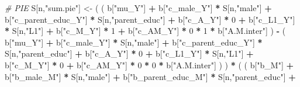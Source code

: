 \documentclass[
]{book}
\newenvironment{Shaded}{\begin{snugshade}}{\end{snugshade}}
\newcommand{\CommentTok}[1]{\textcolor[rgb]{0.56,0.35,0.01}{\textit{#1}}}
\newcommand{\DecValTok}[1]{\textcolor[rgb]{0.00,0.00,0.81}{#1}}
\newcommand{\NormalTok}[1]{#1}
\newcommand{\OtherTok}[1]{\textcolor[rgb]{0.56,0.35,0.01}{#1}}
\newcommand{\SpecialCharTok}[1]{\textcolor[rgb]{0.81,0.36,0.00}{\textbf{#1}}}
\newcommand{\StringTok}[1]{\textcolor[rgb]{0.31,0.60,0.02}{#1}}
\begin{document}
\begin{Shaded}
\begin{Highlighting}[]
    \CommentTok{\# PIE }
\NormalTok{    S[n,}\StringTok{"sum.pie"}\NormalTok{] }\OtherTok{\textless{}{-}}\NormalTok{ ( ( b[}\StringTok{"mu\_Y"}\NormalTok{] }\SpecialCharTok{+} 
\NormalTok{                            b[}\StringTok{"c\_male\_Y"}\NormalTok{] }\SpecialCharTok{*}\NormalTok{ S[n,}\StringTok{"male"}\NormalTok{] }\SpecialCharTok{+} 
\NormalTok{                            b[}\StringTok{"c\_parent\_educ\_Y"}\NormalTok{] }\SpecialCharTok{*}\NormalTok{ S[n,}\StringTok{"parent\_educ"}\NormalTok{] }\SpecialCharTok{+} 
\NormalTok{                            b[}\StringTok{"c\_A\_Y"}\NormalTok{] }\SpecialCharTok{*} \DecValTok{0} \SpecialCharTok{+} 
\NormalTok{                            b[}\StringTok{"c\_L1\_Y"}\NormalTok{] }\SpecialCharTok{*}\NormalTok{ S[n,}\StringTok{"L1"}\NormalTok{] }\SpecialCharTok{+}
\NormalTok{                            b[}\StringTok{"c\_M\_Y"}\NormalTok{] }\SpecialCharTok{*} \DecValTok{1} \SpecialCharTok{+}
\NormalTok{                            b[}\StringTok{"c\_AM\_Y"}\NormalTok{] }\SpecialCharTok{*} \DecValTok{0} \SpecialCharTok{*} \DecValTok{1} \SpecialCharTok{*}\NormalTok{ b[}\StringTok{"A.M.inter"}\NormalTok{] ) }\SpecialCharTok{{-}} 
\NormalTok{                          ( b[}\StringTok{"mu\_Y"}\NormalTok{] }\SpecialCharTok{+} 
\NormalTok{                              b[}\StringTok{"c\_male\_Y"}\NormalTok{] }\SpecialCharTok{*}\NormalTok{ S[n,}\StringTok{"male"}\NormalTok{] }\SpecialCharTok{+} 
\NormalTok{                              b[}\StringTok{"c\_parent\_educ\_Y"}\NormalTok{] }\SpecialCharTok{*}\NormalTok{ S[n,}\StringTok{"parent\_educ"}\NormalTok{] }\SpecialCharTok{+} 
\NormalTok{                              b[}\StringTok{"c\_A\_Y"}\NormalTok{] }\SpecialCharTok{*} \DecValTok{0} \SpecialCharTok{+} 
\NormalTok{                              b[}\StringTok{"c\_L1\_Y"}\NormalTok{] }\SpecialCharTok{*}\NormalTok{ S[n,}\StringTok{"L1"}\NormalTok{] }\SpecialCharTok{+}
\NormalTok{                              b[}\StringTok{"c\_M\_Y"}\NormalTok{] }\SpecialCharTok{*} \DecValTok{0} \SpecialCharTok{+}
\NormalTok{                              b[}\StringTok{"c\_AM\_Y"}\NormalTok{] }\SpecialCharTok{*} \DecValTok{0} \SpecialCharTok{*} \DecValTok{0} \SpecialCharTok{*}\NormalTok{ b[}\StringTok{"A.M.inter"}\NormalTok{] ) ) }\SpecialCharTok{*}
\NormalTok{      ( ( b[}\StringTok{"b\_M"}\NormalTok{] }\SpecialCharTok{+} 
\NormalTok{            b[}\StringTok{"b\_male\_M"}\NormalTok{] }\SpecialCharTok{*}\NormalTok{ S[n,}\StringTok{"male"}\NormalTok{] }\SpecialCharTok{+} 
\NormalTok{            b[}\StringTok{"b\_parent\_educ\_M"}\NormalTok{] }\SpecialCharTok{*}\NormalTok{ S[n,}\StringTok{"parent\_educ"}\NormalTok{] }\SpecialCharTok{+} 

\end{Highlighting}
\end{Shaded}
\end{document}
